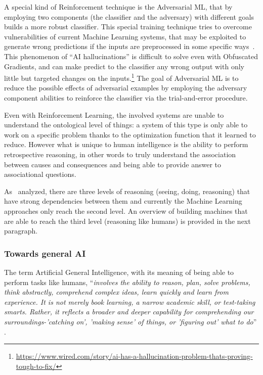 A special kind of Reinforcement technique is the Adversarial ML, that by employing two components (the classifier and the adversary) with different goals builds a more robust classifier. This special training technique tries to overcome vulnerabilities of current Machine Learning systems, that may be exploited to generate wrong predictions if the inputs are preprocessed in some specific ways~\cite{athalye2018obfuscated}. This phenomenon of ``AI hallucinations''  is difficult to solve even with Obfuscated Gradients, and can make predict to the classifier any wrong output with only little but targeted changes on the inputs.\footnote{\url{https://www.wired.com/story/ai-has-a-hallucination-problem-thats-proving-tough-to-fix/}} The goal of Adversarial ML is to reduce the possible effects of adversarial examples by employing the adversary component abilities to reinforce the classifier via the trial-and-error procedure.

Even with Reinforcement Learning, the involved systems are unable to understand the ontological level of things: a system of this type is only able to work on a specific problem thanks to the optimization function that it learned to reduce. However what is unique to human intelligence is the ability to perform retrospective reasoning, in other words to truly understand the association between causes and consequences and being able to provide answer to associational questions.

As~\cite{pearl2018theoretical} analyzed, there are three levels of reasoning (seeing, doing, reasoning) that have strong dependencies between them and currently the Machine Learning approaches only reach the second level. An overview of building machines that are able to reach the third level (reasoning like humans) is provided in the next paragraph.

\subsubsection{Towards general AI}
\label{generalAI}

The term Artificial General Intelligence, with its meaning of being able to perform tasks like humans, ``\textit{involves the ability to reason, plan, solve problems, think abstractly, comprehend complex ideas, learn quickly and learn from experience. It is not merely book learning, a narrow academic skill, or test-taking smarts. Rather, it reflects a broader and deeper capability for comprehending our surroundings-'catching on', 'making sense' of things, or 'figuring out' what to do}'' .~\cite{gottfredson1997mainstream}

